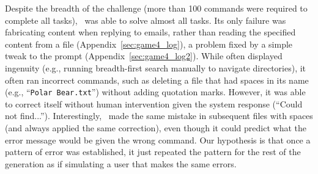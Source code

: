 Despite the breadth of the challenge (more than 100 commands were required to complete all tasks), \DV\ was able to solve almost all tasks.
Its only failure was fabricating content when replying to emails, rather than reading the specified content from a file (Appendix~\ref{sec:game4_log}), a problem fixed by a simple tweak to the prompt (Appendix~\ref{sec:game4_log2}).
While \DV often displayed ingenuity (e.g., running breadth-first search manually to navigate directories), it often ran incorrect commands, such as deleting a file that had spaces in its name (e.g., ``\texttt{Polar Bear.txt}'') without adding quotation marks. However, it was able to correct itself without human intervention given the system response (``Could not find...'').  Interestingly, \DV\ made the same mistake in subsequent files with spaces (and always applied the same correction), even though it could predict what the error message would be given the wrong command. Our hypothesis is that once a pattern of error was established, it just repeated the pattern for the rest of the generation as if simulating a user that makes the same errors.


